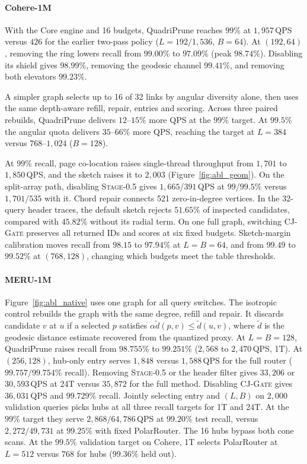 \paragraph{Cohere-1M}
With the Core engine and 16 budgets, QuadriPrune reaches $99\%$ at $1{,}957$\,QPS versus $426$ for the earlier two-pass policy ($L=192/1{,}536$, $B=64$). At $(192,64)$, removing the ring lowers recall from $99.00\%$ to $97.09\%$ (peak $98.74\%$). Disabling its shield gives $98.99\%$, removing the geodesic channel $99.41\%$, and removing both elevators $99.23\%$.

A simpler graph selects up to 16 of 32 links by angular diversity alone, then uses the same depth-aware refill, repair, entries and scoring. Across three paired rebuilds, QuadriPrune delivers $12$--$15\%$ more QPS at the $99\%$ target. At $99.5\%$ the angular quota delivers $35$--$66\%$ more QPS, reaching the target at $L=384$ versus $768$--$1{,}024$ ($B=128$).

At $99\%$ recall, page co-location raises single-thread throughput from $1{,}701$ to $1{,}850$\,QPS, and the sketch raises it to $2{,}003$ (Figure~\ref{fig:abl_geom}). On the split-array path, disabling \textsc{Stage-0.5} gives $1{,}665$/$391$\,QPS at $99/99.5\%$ versus $1{,}701$/$535$ with it. Chord repair connects 521 zero-in-degree vertices. In the 32-query header traces, the default sketch rejects $51.65\%$ of inspected candidates, compared with $45.82\%$ without its radial term. On one full graph, switching \textsc{CJ-Gate} preserves all returned IDs and scores at six fixed budgets. Sketch-margin calibration moves recall from $98.15$ to $97.94\%$ at $L=B=64$, and from $99.49$ to $99.52\%$ at $(768,128)$, changing which budgets meet the table thresholds.

\paragraph{MERU-1M}
Figure~\ref{fig:abl_native} uses one graph for all query switches. The isotropic control rebuilds the graph with the same degree, refill and repair. It discards candidate $v$ at $u$ if a selected $p$ satisfies $\alpha\tilde d(p,v)\le\tilde d(u,v)$, where $\tilde d$ is the geodesic distance estimate recovered from the quantized proxy. At $L=B=128$, QuadriPrune raises recall from $98.755\%$ to $99.251\%$ ($2{,}568$ to $2{,}470$\,QPS, 1T). At $(256,128)$, hub-only entry serves $1{,}848$ versus $1{,}588$\,QPS for the full router ($99.757/99.754\%$ recall). Removing \textsc{Stage-0.5} or the header filter gives $33{,}206$ or $30{,}593$\,QPS at 24T versus $35{,}872$ for the full method. Disabling \textsc{CJ-Gate} gives $36{,}031$\,QPS and $99.729\%$ recall. Jointly selecting entry and $(L,B)$ on $2{,}000$ validation queries picks hubs at all three recall targets for 1T and 24T. At the $99\%$ target they serve $2{,}868/64{,}786$\,QPS at $99.20\%$ test recall, versus $2{,}272/49{,}731$ at $99.25\%$ with fixed PolarRouter. The 16 hubs bypass both cone scans. At the $99.5\%$ validation target on Cohere, 1T selects PolarRouter at $L=512$ versus $768$ for hubs ($99.36\%$ held out).

